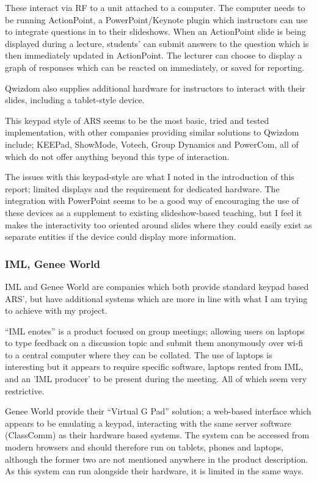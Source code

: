 \documentclass[a4papert,11pt,notitlepage]{ltxdoc}
\begin{document}
These interact via RF to a unit attached to a computer. The computer needs to be running ActionPoint, a PowerPoint/Keynote plugin which instructors can use to integrate questions in to their slideshows. When an ActionPoint slide is being displayed during a lecture, students' can submit answers to the question which is then immediately updated in ActionPoint. The lecturer can choose to display a graph of responses which can be reacted on immediately, or saved for reporting.

Qwizdom also supplies additional hardware for instructors to interact with their slides, including a tablet-style device.

This keypad style of ARS seems to be the most basic, tried and tested implementation, with other companies providing similar solutions to Qwizdom include; KEEPad, ShowMode, Votech, Group Dynamics and PowerCom, all of which do not offer anything beyond this type of interaction.

The issues with this keypad-style are what I noted in the introduction of this report; limited displays and the requirement for dedicated hardware. The integration with PowerPoint seems to be a good way of encouraging the use of these devices as a supplement to existing slideshow-based teaching, but I feel it makes the interactivity too oriented around slides where they could easily exist as separate entities if the device could display more information.

\subsubsection{IML, Genee World}
IML\cite{iml:web} and Genee World\cite{genee:web} are companies which both provide standard keypad based ARS', but have additional systems which are more in line with what I am trying to achieve with my project.

``IML enotes'' is a product focused on group meetings; allowing users on laptops to type feedback on a discussion topic and submit them anonymously over wi-fi to a central computer where they can be collated. The use of laptops is interesting but it appears to require specific software, laptops rented from IML, and an 'IML producer' to be present during the meeting. All of which seem very restrictive.

Genee World provide their ``Virtual G Pad'' solution; a web-based interface which appears to be emulating a keypad, interacting with the same server software (ClassComm) as their hardware based systems. The system can be accessed from modern browsers and should therefore run on tablets, phones and laptops, although the former two are not mentioned anywhere in the product description. As this system can run alongside their hardware, it is limited in the same ways.
\end{document}
